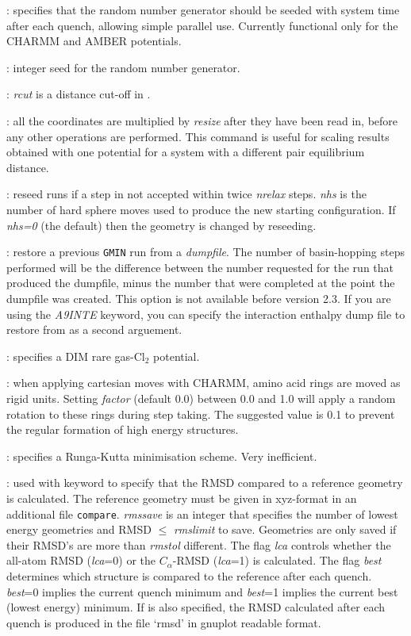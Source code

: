 : specifies that the random number generator should be seeded with system time after each quench, allowing simple parallel use. Currently functional only for the CHARMM and AMBER potentials.

: integer seed for the random number generator.

: {\it rcut\/} is a distance cut-off in {\/}.

: all the coordinates are multiplied by {\it resize\/} after
they have been read in, before any other operations are performed. This command is useful
for scaling results obtained with one potential for a system with a different pair
equilibrium distance.

: reseed runs if a step in not accepted
within twice {\it nrelax} steps.
{\it nhs} is the number of hard sphere moves used to produce the new starting configuration.
If {\it nhs=0} (the default) then the geometry is changed by reseeding.

: restore a previous {\tt GMIN} run from a {\it dumpfile}.
The number of basin-hopping steps performed will be the difference between the number
requested for the run that produced the dumpfile, minus the number that were completed
at the point the dumpfile was created. This option is not available before version 2.3.
If you are using the {\it A9INTE\/} keyword, you can specify the interaction enthalpy
dump file to restore from as a second arguement.

: specifies a DIM rare gas-Cl$_2$ potential.

: when applying cartesian moves with CHARMM, amino acid rings are moved as rigid units. Setting {\it factor} (default 0.0) between 0.0 and 1.0 will apply a random rotation to these rings during step taking. The suggested value is 0.1 to prevent the regular formation of high energy structures. 

: specifies a Runga-Kutta minimisation scheme. 
Very inefficient.

: used with {} keyword to
specify that the RMSD compared to a reference geometry is calculated. The reference geometry must 
be given in xyz-format in an additional file {\tt compare}. {\it rmssave} is an integer 
that specifies the number of lowest energy geometries and RMSD $\le$ {\it rmslimit}
to save. Geometries are only saved if their RMSD's are more than {\it rmstol} 
different. The flag {\it lca} controls whether the all-atom RMSD ({\it lca}=0) or the $C_{\alpha}$-RMSD 
({\it lca}=1) is calculated. The flag {\it best} determines which structure is compared to the reference
after each quench. {\it best}=0 implies the current quench minimum and {\it best}=1 implies the current best (lowest energy) minimum. If {} is also specified, the RMSD calculated after each quench is produced in the file `rmsd' in gnuplot readable format.

